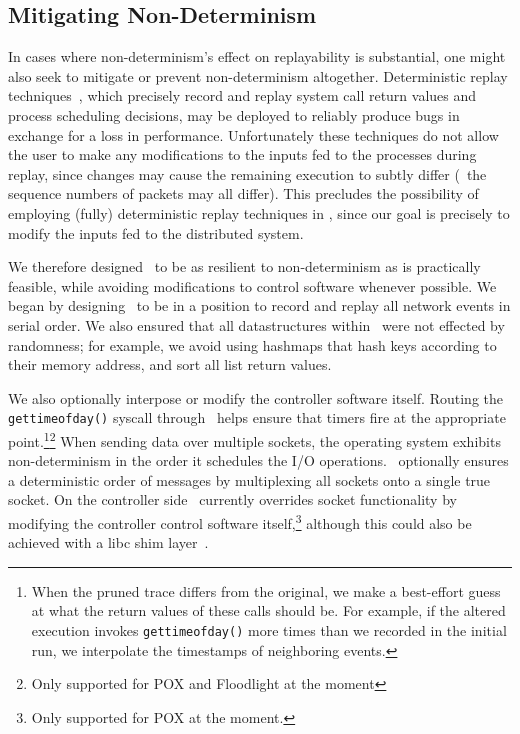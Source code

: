 \subsection{Mitigating Non-Determinism}

In cases where non-determinism's effect on replayability is substantial,
one might also seek to mitigate or prevent non-determinism altogether.
Deterministic replay techniques~\cite{Dunlap:2002:REI:844128.844148,Geels:2006:RDD:1267359.1267386},
which precisely record and replay system call return values and process
scheduling decisions,
may be deployed to reliably produce bugs in exchange for a loss in performance.
Unfortunately these techniques do not allow the user to make any modifications to the inputs fed to the
processes during replay, since changes may cause the remaining execution to
subtly differ (\eg~the sequence numbers of packets may all differ).
This precludes the possibility of employing (fully) deterministic replay techniques in
\projectname, since our goal is precisely to modify the inputs fed to the
distributed system.

We therefore designed \projectname~to be as resilient to non-determinism as is
practically feasible, while avoiding modifications to control software whenever possible.
We began by designing \projectname~to be in a position to
record and replay all network events in serial order. We also ensured that all
datastructures within \projectname~were not effected by randomness; for example,
we avoid using hashmaps that hash keys according to their memory address,
and sort all list return values.

We also optionally interpose or modify the controller software itself.
Routing the {\tt gettimeofday()} syscall through \projectname~helps ensure that timers fire
at the appropriate point.\footnote{When the pruned trace differs from the original, we make a
best-effort guess at what the return values of these calls should be. For example,
if the altered execution invokes {\tt gettimeofday()} more times than we recorded
in the initial run, we interpolate the timestamps of neighboring events.}\footnote{Only supported for POX and Floodlight at the moment}
When sending data over multiple sockets, the operating system exhibits
non-determinism in the order it schedules the I/O operations.
\projectname~optionally ensures a deterministic order of messages
by multiplexing all sockets
onto a single true socket. On the controller side \projectname~currently
overrides socket functionality by modifying the controller control
software itself,\footnote{Only supported for POX at the moment.} although this
could also be achieved with a libc shim layer~\cite{Geels:2006:RDD:1267359.1267386}.

